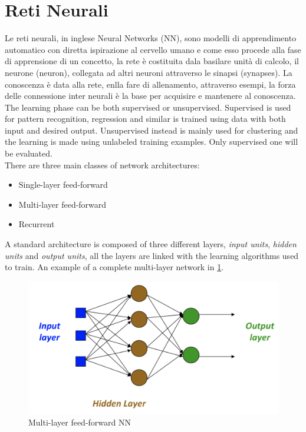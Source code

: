 \documentclass[%
    corpo=12pt,
    twoside,
    oldstyle,
    autoretitolo,
    greek,
    evenboxes,
]{toptesi}
\begin{document}
\section{Reti Neurali}
Le reti neurali, in inglese Neural Networks (NN), sono modelli di apprendimento automatico con diretta ispirazione al cervello umano e come esso procede alla fase di apprensione di un concetto, la rete è costituita dala basilare unità di calcolo, il neurone (neuron), collegata ad altri neuroni attraverso le sinapsi (synapses). La conoscenza è data alla rete, enlla fare di allenamento, attraverso esempi, la forza delle connessione inter neurali è la base per acquisire e mantenere al conoscenza.\\
The learning phase can be both supervised or unsupervised. Supervised is used for pattern recognition, regression and similar is trained using data with both input and desired output. Unsupervised instead is mainly used for clustering and the learning is made using unlabeled training examples. Only supervised one will be evaluated.\\
There are three main classes of network architectures:
\begin{itemize}
  \item Single-layer feed-forward
  \item Multi-layer feed-forward
  \item Recurrent
\end{itemize}
A standard architecture is composed of three different layers, \textit{input units}, \textit{hidden units} and \textit{output units}, all the layers are linked with the learning algorithms used to train. An example of a complete multi-layer network in \ref{fig:mlff}.

\begin{figure}[!ht]
  \includegraphics[width=\linewidth]{figure/feed_foward.png}
  \caption{Multi-layer feed-forward NN}
  \label{fig:mlff}
\end{figure}
\end{document}
